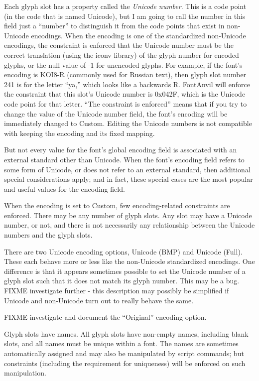 Each glyph slot has a property called the \emph{Unicode number}.  This is a
code point (in the code that is named Unicode), but I am going to call the
number in this field just a ``number'' to distinguish it from the code
points that exist in non-Unicode encodings.  When the encoding is one of the
standardized non-Unicode encodings, the constraint is enforced that the
Unicode number must be the correct translation (using the iconv library) of
the glyph number for encoded glyphs, or the null value of -1 for unencoded
glyphs.  For example, if the font's encoding is KOI8-R (commonly used for
Russian text), then glyph slot number 241 is for the letter ``ya,'' which
looks like a backwards R.  FontAnvil will enforce the constraint that this
slot's Unicode number is 0x042F, which is the Unicode code point for that
letter.  ``The constraint is enforced'' means that if you try to change the
value of the Unicode number field, the font's encoding will be immediately
changed to Custom.  Editing the Unicode numbers is not compatible with
keeping the encoding and its fixed mapping.

But not every value for the font's global encoding field is associated with
an external standard other than Unicode.  When the font's encoding field
refers to some form of Unicode, or does not refer to an external standard,
then additional special considerations apply; and in fact, these special
cases are the most popular and useful values for the encoding field.

When the encoding is set to Custom, few encoding-related constraints are
enforced.  There may be any number of glyph slots.  Any slot may have a
Unicode number, or not, and there is not necessarily any relationship
between the Unicode numbers and the glyph slots.

There are two Unicode encoding options, Unicode (BMP) and Unicode (Full). 
These each behave more or less like the non-Unicode standardized encodings. 
One difference is that it appears sometimes possible to set the Unicode
number of a glyph slot such that it does not match its glyph number.  This
may be a bug.  FIXME investigate further - this description may possibly be
simplified if Unicode and non-Unicode turn out to really behave the same.

FIXME investigate and document the ``Original'' encoding option.

Glyph slots have names.  All glyph slots have non-empty names, including
blank slots, and all names must be unique within a font.  The names are
sometimes automatically assigned and may also be manipulated by script
commands; but constraints (including the requirement for uniqueness) will be
enforced on such manipulation.

